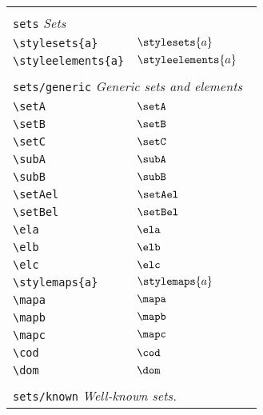 \begin{longtable}{lll}
 &  & \\ 
 \multicolumn{3}{l}{{\color[rgb]{0.5,0.5,0.5}\texttt{sets}} \emph{Sets}}\\ 
 \hline
\hline
{\color[rgb]{0.5,0.5,0.5}\texttt{\textbackslash stylesets\{a\}}} & $\stylesets{a}$ & \\ 
 {\color[rgb]{0.5,0.5,0.5}\texttt{\textbackslash styleelements\{a\}}} & $\styleelements{a}$ & \\ 
  &  & \\ 
 \multicolumn{3}{l}{{\color[rgb]{0.5,0.5,0.5}\texttt{sets/generic}} \emph{Generic sets and elements}}\\ 
 \hline
{\color[rgb]{0.5,0.5,0.5}\texttt{\textbackslash setA}} & $\setA$ & \\ 
 {\color[rgb]{0.5,0.5,0.5}\texttt{\textbackslash setB}} & $\setB$ & \\ 
 {\color[rgb]{0.5,0.5,0.5}\texttt{\textbackslash setC}} & $\setC$ & \\ 
 {\color[rgb]{0.5,0.5,0.5}\texttt{\textbackslash subA}} & $\subA$ & \\ 
 {\color[rgb]{0.5,0.5,0.5}\texttt{\textbackslash subB}} & $\subB$ & \\ 
 {\color[rgb]{0.5,0.5,0.5}\texttt{\textbackslash setAel}} & $\setAel$ & \\ 
 {\color[rgb]{0.5,0.5,0.5}\texttt{\textbackslash setBel}} & $\setBel$ & \\ 
 {\color[rgb]{0.5,0.5,0.5}\texttt{\textbackslash ela}} & $\ela$ & \\ 
 {\color[rgb]{0.5,0.5,0.5}\texttt{\textbackslash elb}} & $\elb$ & \\ 
 {\color[rgb]{0.5,0.5,0.5}\texttt{\textbackslash elc}} & $\elc$ & \\ 
 {\color[rgb]{0.5,0.5,0.5}\texttt{\textbackslash stylemaps\{a\}}} & $\stylemaps{a}$ & \\ 
 {\color[rgb]{0.5,0.5,0.5}\texttt{\textbackslash mapa}} & $\mapa$ & \\ 
 {\color[rgb]{0.5,0.5,0.5}\texttt{\textbackslash mapb}} & $\mapb$ & \\ 
 {\color[rgb]{0.5,0.5,0.5}\texttt{\textbackslash mapc}} & $\mapc$ & \\ 
 {\color[rgb]{0.5,0.5,0.5}\texttt{\textbackslash cod}} & $\cod$ & \\ 
 {\color[rgb]{0.5,0.5,0.5}\texttt{\textbackslash dom}} & $\dom$ & \\ 
  &  & \\ 
 \multicolumn{3}{l}{{\color[rgb]{0.5,0.5,0.5}\texttt{sets/known}} \emph{Well-known sets.}}\\ 

\end{longtable}
